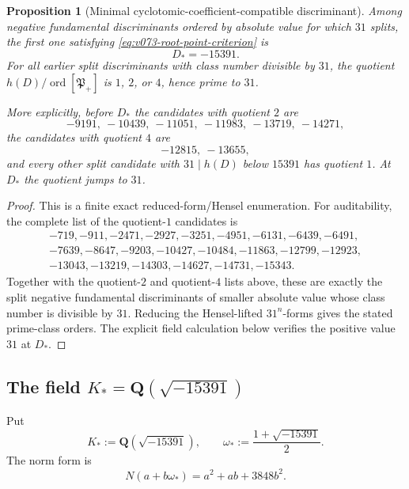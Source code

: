 \documentclass[11pt]{article}
\newtheorem{proposition}[theorem]{Proposition}
\theoremstyle{remark}
\begin{document}
\begin{proposition}[Minimal cyclotomic-coefficient-compatible discriminant]
\label{prop:v073-minimal-root-discriminant}
Among negative fundamental discriminants ordered by absolute value for which
\(31\) splits, the first one satisfying
\eqref{eq:v073-root-point-criterion} is
\begin{equation}
 \boxed{D_*=-15391.}
 \label{eq:v073-Dstar}
\end{equation}
For all earlier split discriminants with class number divisible by \(31\),
the quotient
\(
h(D)/\operatorname{ord}[\mathfrak P_+]
\)
is \(1\), \(2\), or \(4\), hence prime to \(31\).

More explicitly, before \(D_*\) the candidates with quotient \(2\) are
\[
 -9191,\ -10439,\ -11051,\ -11983,\ -13719,\ -14271,
\]
the candidates with quotient \(4\) are
\[
 -12815,\ -13655,
\]
and every other split candidate with \(31\mid h(D)\) below \(15391\) has
quotient \(1\).  At \(D_*\) the quotient jumps to \(31\).
\end{proposition}

\begin{proof}
This is a finite exact reduced-form/Hensel enumeration.  For auditability,
the complete list of the quotient-\(1\) candidates is
\[
\begin{gathered}
-719,-911,-2471,-2927,-3251,-4951,-6131,-6439,-6491,\\
-7639,-8647,-9203,-10427,-10484,-11863,-12799,-12923,\\
-13043,-13219,-14303,-14627,-14731,-15343.
\end{gathered}
\]
Together with the quotient-\(2\) and quotient-\(4\) lists above, these are
exactly the split negative fundamental discriminants of smaller absolute
value whose class number is divisible by \(31\).  Reducing the Hensel-lifted
\(31^n\)-forms gives the stated prime-class orders.  The explicit field
calculation below verifies the positive value \(31\) at \(D_*\).
\end{proof}


\subsection{The field \texorpdfstring{\(K_*=\mathbf Q(\sqrt{-15391})\)}{K*=Q(sqrt(-15391))}}

Put
\[
 \boxed{
 K_*:=\mathbf Q(\sqrt{-15391}),
 \qquad
 \omega_*:=\frac{1+\sqrt{-15391}}2.}
 \label{eq:v073-Kstar}
\]
The norm form is
\begin{equation}
 \boxed{
 N(a+b\omega_*)
 =a^2+ab+3848b^2.}
 \label{eq:v073-norm-form}
\end{equation}
\end{document}
